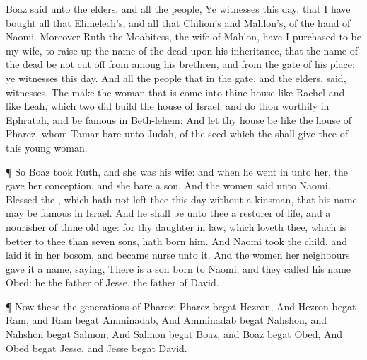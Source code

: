 {Boaz
said unto the
elders, and
{} all the
people, Ye
{}
witnesses this
day, that I have
bought all that
{}
Elimelech’s, and all that
{}
Chilion’s and
Mahlon’s, of the
hand of
Naomi.
Moreover
Ruth the
Moabitess, the
wife of
Mahlon, have I
purchased to be my
wife, to raise
up the
name of the
dead upon his
inheritance, that the
name of the
dead be not cut
off from
among his
brethren, and from the
gate of his
place: ye
{}
witnesses this
day.
And all the
people that
{} in the
gate, and the
elders,
said,
{}
witnesses. The
{}
make the
woman that is
come into thine
house like
Rachel and like
Leah, which
two did
build the
house of
Israel: and
do thou
worthily in
Ephratah, and be
famous in
Beth-lehem:
And let thy
house be like the
house of
Pharez, whom
Tamar
bare unto
Judah, of the
seed which the
{} shall
give thee of this young
woman.
\par }{\PP {}¶ So
Boaz
took
Ruth, and she was his
wife: and when he went
in unto her, the
{}
gave her
conception, and she
bare a
son.
And the
women
said unto
Naomi,
Blessed
{} the
{}, which hath not
left thee this
day without a
kinsman, that his
name may be
famous in
Israel.
And he shall be unto thee a
restorer of
{}
life, and a
nourisher of thine old
age: for thy daughter in
law, which
loveth thee, which is
better to thee than
seven
sons, hath
born him.
And
Naomi
took the
child, and
laid it in her
bosom, and became
nurse unto it.
And the women her
neighbours
gave it a
name,
saying, There is a
son
born to
Naomi; and they
called his
name
Obed: he
{} the
father of
Jesse, the
father of
David.
\par }{\PP {}¶ Now these
{} the
generations of
Pharez:
Pharez
begat
Hezron,
And
Hezron
begat
Ram, and
Ram
begat
Amminadab,
And
Amminadab
begat
Nahshon, and
Nahshon
begat
Salmon,
And
Salmon
begat
Boaz, and
Boaz
begat
Obed,
And
Obed
begat
Jesse, and
Jesse
begat
David.
\par }